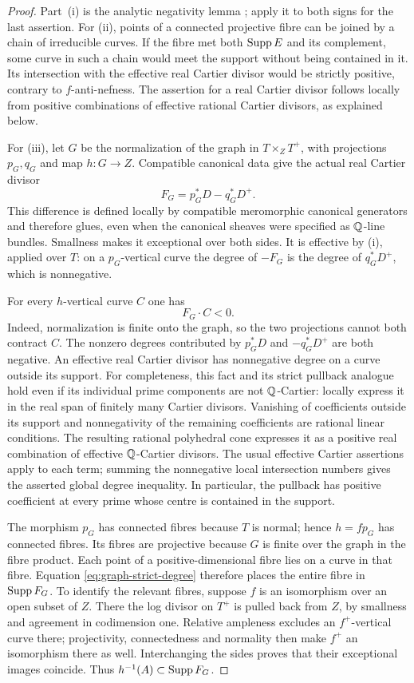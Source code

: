 \begin{proof}
Part~(i) is the analytic negativity lemma
\cite[Lemma~2.5]{HX2026}; apply it to both signs for the last assertion.
For (ii), points of a connected projective fibre can be joined by a
chain of irreducible curves.  If the fibre met both $\operatorname{Supp} E$ and
its complement, some curve in such a chain would meet the support
without being contained in it.  Its intersection with the effective
real Cartier divisor would be strictly positive, contrary to
$f$-anti-nefness.  The assertion for a real Cartier divisor follows
locally from positive combinations of effective rational Cartier
divisors, as explained below.

For (iii), let $G$ be the normalization of the graph in
$T\times_ZT^+$, with projections $p_G,q_G$ and map $h:G\to Z$.
Compatible canonical data give the actual real Cartier divisor
\[
 F_G=p_G^*D-q_G^*D^+.
\]
This difference is defined locally by compatible meromorphic canonical
generators and therefore glues, even when the canonical sheaves were
specified as $\mathbb Q$-line bundles.  Smallness makes it exceptional over
both sides.  It is effective by (i), applied over $T$: on a
$p_G$-vertical curve the degree of $-F_G$ is the degree of
$q_G^*D^+$, which is nonnegative.

For every $h$-vertical curve $C$ one has
\begin{equation}\label{eq:graph-strict-degree}
 F_G\cdot C<0.
\end{equation}
Indeed, normalization is finite onto the graph, so the two projections
cannot both contract $C$.  The nonzero degrees contributed by $p_G^*D$
and $-q_G^*D^+$ are both negative.  An effective real Cartier divisor
has nonnegative degree on a curve outside its support.  For completeness,
this fact and its strict pullback analogue hold even if its individual
prime components are not $\mathbb Q$-Cartier: locally express it in the real
span of finitely many Cartier divisors.  Vanishing of coefficients
outside its support and nonnegativity of the remaining coefficients
are rational linear conditions.  The resulting rational polyhedral
cone expresses it as a positive real combination of effective
$\mathbb Q$-Cartier divisors.  The usual effective Cartier assertions apply
to each term; summing the nonnegative local intersection numbers
gives the asserted global degree inequality.  In particular, the pullback has positive coefficient
at every prime whose centre is contained in the support.

The morphism $p_G$ has connected fibres because $T$ is normal;
hence $h=f p_G$ has connected fibres.  Its fibres are projective
because $G$ is finite over the graph in the fibre product.  Each
point of a positive-dimensional fibre lies on a curve in that fibre.  Equation
\eqref{eq:graph-strict-degree} therefore places the entire fibre in
$\operatorname{Supp} F_G$.  To identify the relevant fibres, suppose $f$ is an
isomorphism over an open subset of $Z$.  There the log divisor on
$T^+$ is pulled back from $Z$, by smallness and agreement in codimension
one.  Relative ampleness excludes an $f^+$-vertical curve there;
projectivity, connectedness and normality then make $f^+$ an
isomorphism there as well.  Interchanging the sides proves that their
exceptional images coincide.  Thus $h^{-1}(A)\subset\operatorname{Supp} F_G$.


\end{proof}

